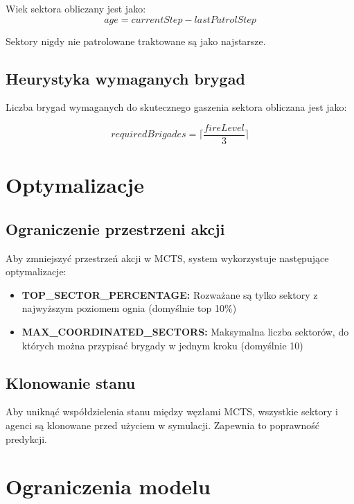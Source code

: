 \documentclass[11pt,a4paper]{article}
\begin{document}
Wiek sektora obliczany jest jako:
\begin{equation}
age = currentStep - lastPatrolStep
\end{equation}

Sektory nigdy nie patrolowane traktowane są jako najstarsze.

\subsection{Heurystyka wymaganych brygad}

Liczba brygad wymaganych do skutecznego gaszenia sektora obliczana jest jako:

\begin{equation}
requiredBrigades = \lceil \frac{fireLevel}{3} \rceil
\end{equation}

\section{Optymalizacje}

\subsection{Ograniczenie przestrzeni akcji}

Aby zmniejszyć przestrzeń akcji w MCTS, system wykorzystuje następujące optymalizacje:

\begin{itemize}
    \item \textbf{TOP\_SECTOR\_PERCENTAGE:} Rozważane są tylko sektory z najwyższym poziomem ognia (domyślnie top 10\%)
    \item \textbf{MAX\_COORDINATED\_SECTORS:} Maksymalna liczba sektorów, do których można przypisać brygady w jednym kroku (domyślnie 10)
\end{itemize}

\subsection{Klonowanie stanu}

Aby uniknąć współdzielenia stanu między węzłami MCTS, wszystkie sektory i agenci są klonowane przed użyciem w symulacji. Zapewnia to poprawność predykcji.

\section{Ograniczenia modelu}
\end{document}
